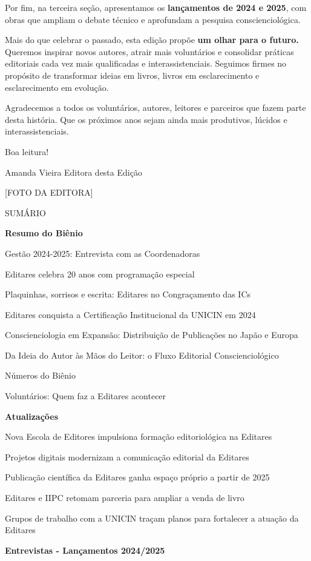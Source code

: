 Por fim, na terceira seção, apresentamos os \textbf{lançamentos de 2024 e 2025}, com obras que ampliam o debate técnico e aprofundam a pesquisa conscienciológica.

Mais do que celebrar o passado, esta edição propõe \textbf{um olhar para o futuro.} Queremos inspirar novos autores, atrair mais voluntários e consolidar práticas editoriais cada vez mais qualificadas e interassistenciais. Seguimos firmes no propósito de transformar ideias em livros, livros em esclarecimento e esclarecimento em evolução.

Agradecemos a todos os voluntários, autores, leitores e parceiros que fazem parte desta história. Que os próximos anos sejam ainda mais produtivos, lúcidos e interassistenciais.

Boa leitura!

Amanda Vieira\textbf{\hfill\break
} Editora desta Edição

{[}FOTO DA EDITORA{]}

SUMÁRIO

\textbf{Resumo do Biênio}

Gestão 2024-2025: Entrevista com as Coordenadoras

Editares celebra 20 anos com programação especial

Plaquinhas, sorrisos e escrita: Editares no Congraçamento das ICs

Editares conquista a Certificação Institucional da UNICIN em 2024

Conscienciologia em Expansão: Distribuição de Publicações no Japão e Europa

Da Ideia do Autor às Mãos do Leitor: o Fluxo Editorial Conscienciológico

Números do Biênio

Voluntários: Quem faz a Editares acontecer

\textbf{Atualizações}

Nova Escola de Editores impulsiona formação editoriológica na Editares

Projetos digitais modernizam a comunicação editorial da Editares

Publicação científica da Editares ganha espaço próprio a partir de 2025

Editares e IIPC retomam parceria para ampliar a venda de livro

Grupos de trabalho com a UNICIN traçam planos para fortalecer a atuação da Editares

\textbf{Entrevistas - Lançamentos 2024/2025}

